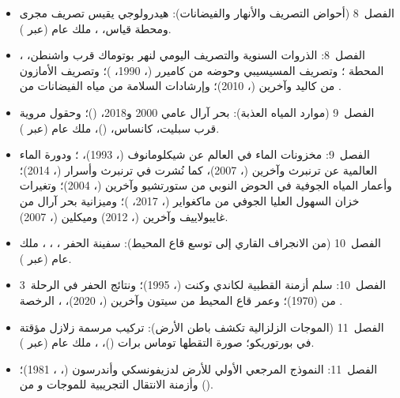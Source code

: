 \begin{itemize}
  \item الفصل~8 (أحواض التصريف والأنهار والفيضانات): هيدرولوجي يقيس تصريف مجرى ومحطة قياس، ، ملك عام (عبر ).
  \item الفصل~8: الذروات السنوية والتصريف اليومي لنهر بوتوماك قرب واشنطن، ، المحطة ؛ وتصريف المسيسيبي وحوضه من كاميرر (، 1990، )؛ وتصريف الأمازون من كاليد وآخرين (، 2010)؛ وإرشادات السلامة من مياه الفيضانات من .
  \item الفصل~9 (موارد المياه العذبة): بحر آرال عامي 2000 و2018،  ()؛ وحقول مروية قرب سبليت، كانساس،  ()، ملك عام (عبر ).
  \item الفصل~9: مخزونات الماء في العالم عن شيكلومانوف (، 1993)، ؛ ودورة الماء العالمية عن ترنبرث وآخرين (، 2007)، كما نُشرت في ترنبرث وأسرار (، 2014)؛ وأعمار المياه الجوفية في الحوض النوبي من ستورتشيو وآخرين (، 2004)؛ وتغيرات خزان السهول العليا الجوفي من ماكغواير (، 2017، )؛ وميزانية بحر آرال من غايبولاييف وآخرين (، 2012) وميكلين (، 2007).
  \item الفصل~10 (من الانجراف القاري إلى توسع قاع المحيط): سفينة الحفر ، ، ، ملك عام (عبر ).
  \item الفصل~10: سلم أزمنة القطبية لكاندي وكنت (، 1995)؛ ونتائج الحفر في الرحلة~3 من  (1970)؛ وعمر قاع المحيط من سيتون وآخرين (، 2020)، ، الرخصة .
  \item الفصل~11 (الموجات الزلزالية تكشف باطن الأرض): تركيب مرسمة زلازل مؤقتة في بورتوريكو؛ صورة التقطها توماس برات ()، ، ملك عام (عبر ).
  \item الفصل~11: النموذج المرجعي الأولي للأرض لدزيفونسكي وأندرسون (، ، 1981)؛ وأزمنة الانتقال التجريبية للموجات  و من  ().

\end{itemize}
